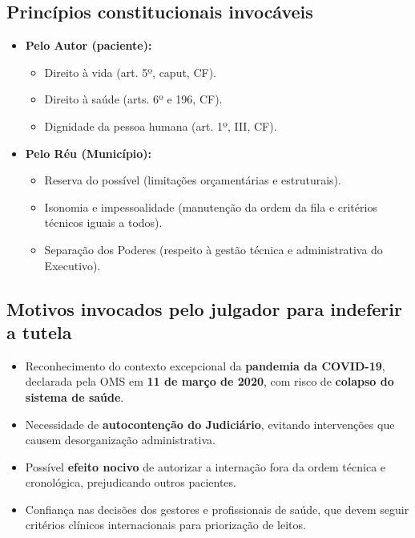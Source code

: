 \documentclass[12pt]{article}
\begin{document}
\subsection*{Princípios constitucionais invocáveis}
\label{sec:org918ea1b}
\begin{itemize}
\item \textbf{\textbf{Pelo Autor (paciente):}}  
\begin{itemize}
\item Direito à vida (art. 5º, caput, CF).
\item Direito à saúde (arts. 6º e 196, CF).
\item Dignidade da pessoa humana (art. 1º, III, CF).
\end{itemize}

\item \textbf{\textbf{Pelo Réu (Município):}}  
\begin{itemize}
\item Reserva do possível (limitações orçamentárias e estruturais).
\item Isonomia e impessoalidade (manutenção da ordem da fila e critérios técnicos iguais a todos).
\item Separação dos Poderes (respeito à gestão técnica e administrativa do Executivo).
\end{itemize}
\end{itemize}

\subsection*{Motivos invocados pelo julgador para indeferir a tutela}
\label{sec:orga072371}
\begin{itemize}
\item Reconhecimento do contexto excepcional da \textbf{\textbf{pandemia da COVID-19}}, declarada pela OMS em \textbf{\textbf{11 de março de 2020}}, com risco de \textbf{\textbf{colapso do sistema de saúde}}.
\item Necessidade de \textbf{\textbf{autocontenção do Judiciário}}, evitando intervenções que causem desorganização administrativa.
\item Possível \textbf{\textbf{efeito nocivo}} de autorizar a internação fora da ordem técnica e cronológica, prejudicando outros pacientes.
\item Confiança nas decisões dos gestores e profissionais de saúde, que devem seguir critérios clínicos internacionais para priorização de leitos.
\end{itemize}
\end{document}
